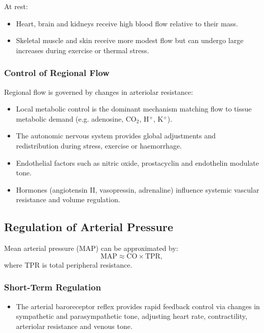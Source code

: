 \documentclass[11pt,a4paper]{article}
\begin{document}
At rest:
\begin{itemize}
  \item Heart, brain and kidneys receive high blood flow relative to their mass.
  \item Skeletal muscle and skin receive more modest flow but can undergo large increases during exercise or thermal stress.
\end{itemize}

\subsubsection{Control of Regional Flow}

Regional flow is governed by changes in arteriolar resistance:
\begin{itemize}
  \item Local metabolic control is the dominant mechanism matching flow to tissue metabolic demand (e.g. adenosine, CO$_2$, H$^+$, K$^+$).
  \item The autonomic nervous system provides global adjustments and redistribution during stress, exercise or haemorrhage.
  \item Endothelial factors such as nitric oxide, prostacyclin and endothelin modulate tone.
  \item Hormones (angiotensin II, vasopressin, adrenaline) influence systemic vascular resistance and volume regulation.
\end{itemize}

\subsection{Regulation of Arterial Pressure}

Mean arterial pressure (MAP) can be approximated by:
\[
\text{MAP} \approx \text{CO} \times \text{TPR},
\]
where TPR is total peripheral resistance.

\subsubsection{Short-Term Regulation}

\begin{itemize}
  \item The arterial baroreceptor reflex provides rapid feedback control via changes in sympathetic and parasympathetic tone, adjusting heart rate, contractility, arteriolar resistance and venous tone.
\end{itemize}
\end{document}
